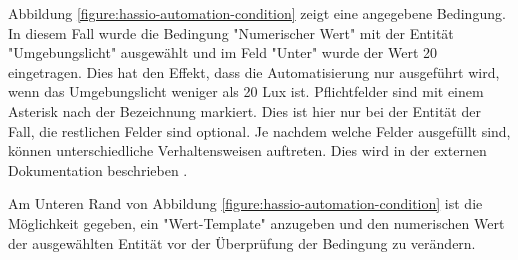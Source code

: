 Abbildung \ref{figure:hassio-automation-condition} zeigt eine angegebene Bedingung. In diesem Fall
wurde  die Bedingung "Numerischer Wert" mit der Entität "Umgebungslicht" ausgewählt und im Feld
"Unter" wurde der Wert 20 eingetragen. Dies hat den Effekt, dass die Automatisierung nur ausgeführt
wird, wenn das Umgebungslicht weniger als 20 Lux ist. Pflichtfelder sind mit einem Asterisk nach der
Bezeichnung markiert. Dies ist hier nur bei der Entität der Fall, die restlichen Felder sind
optional. Je nachdem welche Felder ausgefüllt sind, können unterschiedliche Verhaltensweisen
auftreten. Dies wird in der externen Dokumentation beschrieben \parencite{homeassistantConditions}.

Am Unteren Rand von Abbildung \ref{figure:hassio-automation-condition} ist die Möglichkeit gegeben,
ein "Wert-Template" anzugeben und den numerischen Wert der ausgewählten Entität vor der Überprüfung
der Bedingung zu verändern.


